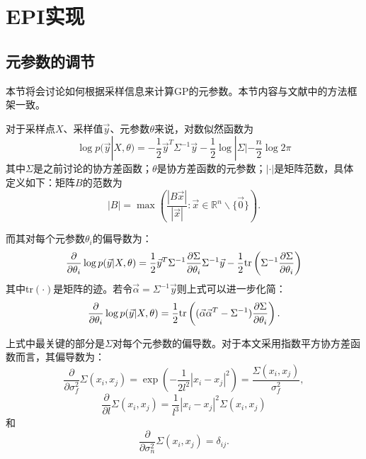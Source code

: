 \documentclass[index]{subfiles}
\begin{document}

\section{EPI实现} %
\label{cha:EPI Implementation}

\subsection{元参数的调节} %
\label{sec:Adaptation of hyperparameters}

本节将会讨论如何根据采样信息来计算GP的元参数。本节内容与文献\cite{RW}中的方法框架一致。

对于采样点$X$、采样值$\vec{y}$、元参数$\theta$来说，对数似然函数为
\begin{equation}
    \log p(\vec{y}|X, \theta) = -\frac{1}{2}\vec{y}^{T}\Sigma^{-1}\vec{y} - \frac{1}{2}\log|\Sigma| - \frac{n}{2} \log 2\pi
\end{equation}
其中$\Sigma$是之前讨论的协方差函数；$\theta$是协方差函数的元参数；$|\cdot|$是矩阵范数，具体定义如下：矩阵$B$的范数为
\begin{equation}
    |B| = \max \left( \frac{|B\vec{x}|}{|\vec{x}|} : \vec{x} \in \mathbb{R}^{n}\backslash\{\vec{0}\} \right).
\end{equation}

而其对每个元参数$\theta_{i}$的偏导数为：
\begin{equation}
    \frac{\partial}{\partial \theta_{i}} \log p(\vec{y}|X,\theta) = \frac{1}{2}\vec{y}^{T}\Sigma^{-1}\frac{\partial \Sigma}{\partial \theta_{i}} \Sigma^{-1}\vec{y} - \frac{1}{2} {\rm tr}\left( \Sigma^{-1}\frac{\partial \Sigma}{\partial \theta_{i}} \right)
\end{equation}
其中tr$(\cdot)$是矩阵的迹。若令$\vec{\alpha} = \Sigma^{-1}\vec{y}$则上式可以进一步化简：
\begin{equation}
    \frac{\partial}{\partial \theta_{i}} \log p(\vec{y}|X,\theta) = \frac{1}{2} {\rm tr}\left((\vec{\alpha}\vec{\alpha}^{T} - \Sigma^{-1})\frac{\partial \Sigma}{\partial \theta_{i}}\right).
\end{equation}

上式中最关键的部分是$\Sigma$对每个元参数的偏导数。对于本文采用指数平方协方差函数而言，其偏导数为：
\begin{equation}
    \frac{\partial}{\partial \sigma_{f}^{2}} \Sigma(x_{i}, x_{j}) = \exp\left( -\frac{1}{2l^{2}} |x_{i} - x_{j}|^{2}\right) = \frac{\Sigma(x_{i}, x_{j})}{\sigma_{f}^{2}},
\end{equation}
\begin{equation}
    \frac{\partial}{\partial l} \Sigma(x_{i}, x_{j}) = \frac{1}{l^{3}}|x_{i} - x_{j}|^{2}\Sigma(x_{i}, x_{j})
\end{equation}
和
\begin{equation}
    \frac{\partial}{\partial \sigma_{n}^{2}} \Sigma(x_{i}, x_{j}) = \delta_{ij}.
\end{equation}
\end{document}

